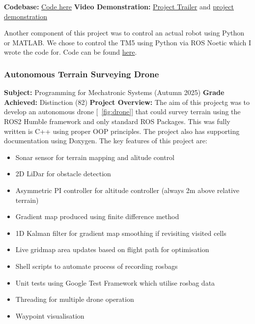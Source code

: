 \textbf{Codebase: } \href{https://github.com/jackfruittt/Industrial_Robotics_A2}{Code here} \newline
\textbf{Video Demonstration: } \href{https://www.youtube.com/watch?v=JsQmZcRGo9Y}{Project Trailer} and \href{https://youtu.be/irytygtPb94}{project demonstration} \newline

Another component of this project was to control an actual robot using Python or MATLAB. We chose to control the TM5 using Python via ROS Noetic which I wrote the code for. 
Code can be found \href{https://github.com/jackfruittt/tm5_ros_python}{here}.




\newpage
\subsubsection{Autonomous Terrain Surveying Drone}
\textbf{Subject: } Programming for Mechatronic Systems (Autumn 2025) \newline
\textbf{Grade Achieved: } Distinction (82) \newline
\textbf{Project Overview: }
The aim of this projectg was to develop an autonomous drone [~\ref{fig:drone}] that could survey terrain using the ROS2 Humble framework and only standard ROS Packages. This was fully written is C++
using proper OOP principles. The project also has supporting documentation using Doxygen. The key features of this project are:

\begin{itemize}
    \item Sonar sensor for terrain mapping and alitude control
    \item 2D LiDar for obstacle detection
    \item Asymmetric PI controller for altitude controller (always 2m above relative terrain)
    \item Gradient map produced using finite difference method
    \item 1D Kalman filter for gradient map smoothing if revisiting visited cells
    \item Live gridmap area updates based on flight path for optimisation
    \item Shell scripts to automate process of recording rosbags
    \item Unit tests using Google Test Framework which utilise rosbag data
    \item Threading for multiple drone operation
    \item Waypoint visualisation
\end{itemize}

